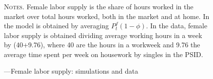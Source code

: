 \documentclass[12pt]{article}
\begin{document}
\begin{figure}
\begin{center}
\caption{---Female labor supply: simulations and data}
\label{fig:fls}
\hspace*{-1.3cm} 
\scalebox{0.99}{} 
\end{center}
\begin{minipage}{0.99\textwidth} %
	{\footnotesize \textsc{Notes.} Female labor supply is the share of hours worked in the market over total hours worked, both in the market and at home. In the model is obtained by averaging $P^f_t(1-\phi)$. In the data, female labor supply is obtained dividing average working hours in a week by (40+9.76), where 40 are the hours in a workweek and 9.76 the average time spent per week on housework by singles in the PSID. \par}
\end{minipage}
\end{figure}
\end{document}
